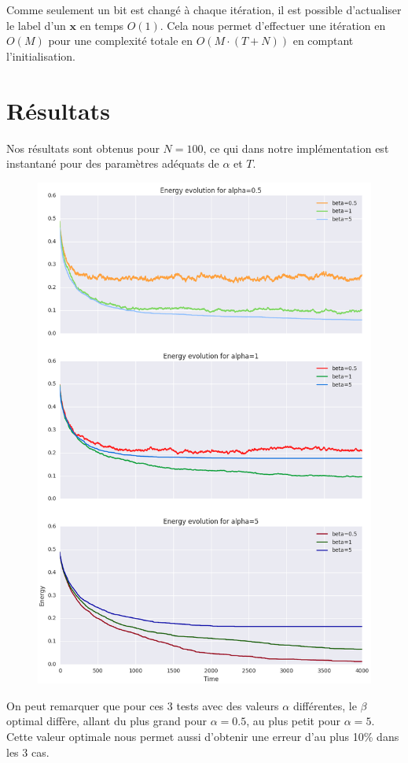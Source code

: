\documentclass[twocolumn]{article}
\begin{document}
		Comme seulement un bit est changé à chaque itération, il est possible d'actualiser le label d'un $\mathbf{x}$ en temps $O(1)$. Cela nous permet d'effectuer une itération en $O(M)$ pour une complexité totale en $O(M\cdot(T + N))$ en comptant l'initialisation.
		
	\section{Résultats}
		Nos résultats sont obtenus pour $N=100$, ce qui dans notre implémentation est instantané pour des paramètres adéquats de $\alpha$ et $T$.
		\begin{figure}[h]
			\includegraphics[width=\columnwidth]{../tobekept/ex1_1755923751722050074-r.png}
		\end{figure}
		On peut remarquer que pour ces 3 tests avec des valeurs $\alpha$ différentes, le $\beta$ optimal diffère, allant du plus grand pour $\alpha = 0.5$, au plus petit pour $\alpha = 5$.
		Cette valeur optimale nous permet aussi d'obtenir une erreur d'au plus 10\% dans les 3 cas.
		
\end{document}
